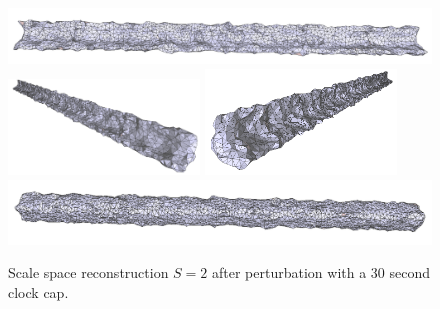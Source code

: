 \documentclass[12pt]{drexelthesis}
\begin{document}
\begin{figure}[!ht]
	
	\centering
		\includegraphics[width=5in]{simulated-lab-scan/2cmnoise/optimizedNeat/scalespace2perturb00.png}
		\includegraphics[width=2in]{simulated-lab-scan/2cmnoise/optimizedNeat/scalespace2perturb01.png}
		\includegraphics[width=2in]{simulated-lab-scan/2cmnoise/optimizedNeat/scalespace2perturb02.png}
		\includegraphics[width=5in]{simulated-lab-scan/2cmnoise/optimizedNeat/scalespace2perturb03.png}
		\caption[Scale space reconstruction $S = 2$ after perturbation with a 30 second clock cap]{\centering Scale space reconstruction $S = 2$ after perturbation with a 30 second clock cap.}
	\label{2cmnoise:scalespace2perturb}
\end{figure}

\end{document}
